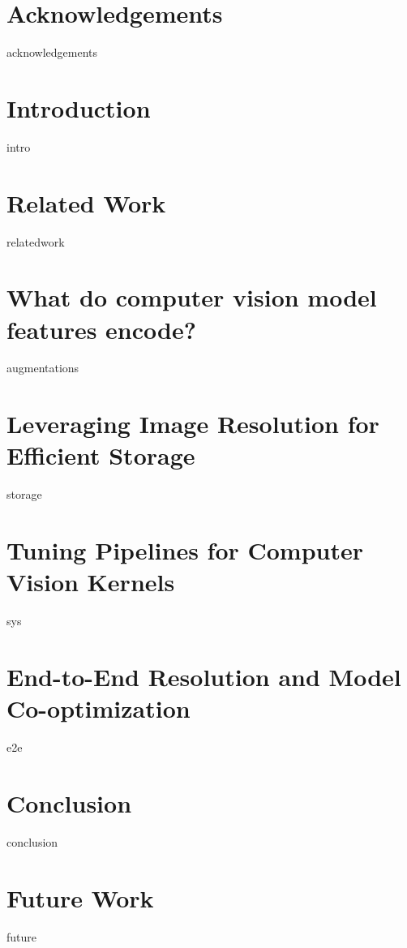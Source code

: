 \documentclass[ twoside,openright,titlepage,numbers=noenddot,headinclude,
                footinclude=true,cleardoublepage=empty,abstractoff,%
                BCOR=5mm,paper=letter,fontsize=11pt,letterpaper,%
                american,%
                ]{scrreprt}
\begin{document}

\cleardoublepage
{}
\chapter*{Acknowledgements}
{acknowledgements}

\chapter{Introduction}
{intro}

\chapter{Related Work}
{relatedwork}

\chapter{What do computer vision model features encode?}
\label{ch:augmentations}
{augmentations}

\chapter{Leveraging Image Resolution for Efficient Storage}
\label{ch:storage}
{storage}

\chapter{Tuning Pipelines for Computer Vision Kernels}
\label{ch:sys}
{sys}

\chapter{End-to-End Resolution and Model Co-optimization}
\label{ch:e2e}
{e2e}

\chapter{Conclusion}
{conclusion}

\chapter{Future Work}
{future}
\end{document}
